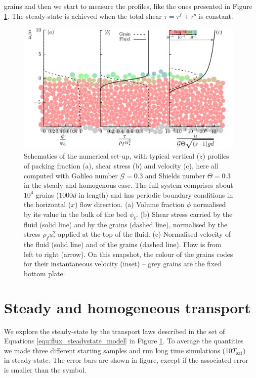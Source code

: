 grains and then we start to measure the profiles, like the ones presented in Figure \ref{fig:TM_profiles}. The steady-state is achieved when the total shear $\tau=\tau^f+\tau^p$ is constant.

\begin{figure}
    \centering
    \includegraphics[width=0.9\linewidth]{04-figuras/TM-profiles.pdf}
    \caption[Transport profiles.]{Schematics of the numerical set-up, with typical vertical ($z$) profiles of packing fraction (a), shear stress (b) and velocity (c), here all computed with Galileo number $\mathcal{G}=0.3$ and Shields number $\Theta=0.3$ in the steady and homogenous case. The full system comprises about $10^4$ grains ($1000d$ in length) and has periodic boundary conditions in the horizontal ($x$) flow direction. (a) Volume fraction $\phi$ normalised by its value in the bulk of the bed $\phi_b$. (b) Shear stress carried by the fluid (solid line) and by the grains (dashed line), normalised by the stress $\rho_f u_*^2$ applied at the top of the fluid. (c) Normalised velocity of the fluid (solid line) and of the grains (dashed line). Flow is from left to right (arrow). On this snapshot, the colour of the grains codes for their instantaneous velocity (inset) -- grey grains are the fixed bottom plate.}
    \label{fig:TM_profiles}
\end{figure}

\section{Steady and homogeneous transport}
    We explore the steady-state by the transport laws described in the set of Equations \ref{equ:flux_steadystate_model} in Figure \ref{fig:TM_profiles}. To average the quantities we made three different starting samples and run long time simulations (10$T_\textrm{sat}$) in steady-state. The error bars are shown in figure, except if the associated error is smaller than the symbol.

